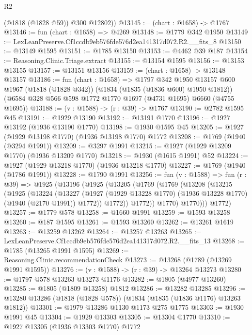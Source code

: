 \begin{lexlean}{R2}
\begin{coremodule}
        (@1818 (@1828 @59))
        @300
        @12802))
@13145 := (chart : @1658) -> @1767
@13146 := fun (chart : @1658) => @4269
@13148 := @1779 @342 @1950
@13149 := LexLeanPreserve.Cf1ccdb9eb576fde576d2ea141317d072.R2.__fits_8
@13150 := @13149 @1595
@13151 := @1785 @13150
@13153 := @4462 @39 @187
@13154 := Reasoning.Clinic.Triage.extract
@13155 := @13154 @1595
@13156 := @13153 @13155
@13157 := @13151 @13156
@13159 := (chart : @1658) -> @13148 @13157
@13186 := fun (chart : @1658) =>
  @1797
    @342
    @1950
    @13157
    @600
    @1967
    (@1818 (@1828 @342))
    (@1834 (@1835 (@1836 @600) @1950 @1812))
    (@6584 @328 @566 @598 @1772 @1770 @1697 (@4731 @1695) @6660 (@4755 @1695))
@13188 := (v : @1588) -> (r : @39) -> @1767
@13190 := @2782 @1595 @45
@13191 := @1929 @13190
@13192 := @13191 @1770
@13196 := @1927 @13192 (@1936 @13190 @1770)
@13198 := @1930 @1595 @45
@13205 := @1927 (@1929 @13198 @1770) (@1936 @13198 @1770) @1772
@13208 := @1769 (@1940 (@3294 @1991))
@13209 := @3297 @1991
@13215 := @1927 (@1929 @13209 @1770) (@1936 @13209 @1770)
@13218 := @1930 (@1615 @1991) @52
@13224 := @1927 (@1929 @13218 @1770) (@1936 @13218 @1770)
@13227 := @1769 (@1940 (@1786 @1991))
@13228 := @1790 @1991
@13256 := fun (v : @1588) =>
  fun (r : @39) =>
  @1925
    (@13196
      (@1925
        (@13205
          (@1769
            (@1769
              (@13208
                (@13215
                  (@1925
                    (@13224
                      (@13227
                        (@1927
                          (@1929 @13228 @1770)
                          (@1936 @13228 @1770)
                          (@1940 (@2170 @1991))
                          @1772))
                      @1772))
                  @1772))
              @1770)
            @1770)))
      @1772)
@13257 := @1779 @578
@13258 := @1660 @1991
@13259 := @1593 @13258
@13260 := @187 @1595
@13261 := @1593 @13260
@13262 := @13261 @1619
@13263 := @13259 @13262
@13264 := @13257 @13263
@13265 := LexLeanPreserve.Cf1ccdb9eb576fde576d2ea141317d072.R2.__fits_13
@13268 := @1785 (@13265 @1991 @1595)
@13269 := Reasoning.Clinic.recommendationCheck
@13273 := @13268 (@1789 (@13269 @1991 @1595))
@13276 := (v : @1588) -> (r : @39) -> @13264 @13273
@13280 := @1797 @578 @13263 @13273 @1176
@13282 := @1805 (@4977 @13260)
@13285 := @1805 (@1809 @13258) @1812
@13286 := @13282 @13285
@13296 := @13280 @13286 (@1818 (@1828 @578)) (@1834 (@1835 (@1836 @1176) @13263 @1812))
@13301 := @1979 @13286 @1130 @1173 @275 @1775
@13303 := @1930 @1991 @45
@13304 := @1929 @13303
@13305 := @13304 @1770
@13310 := @1927 @13305 (@1936 @13303 @1770) @1772

\end{coremodule}
\end{lexlean}
